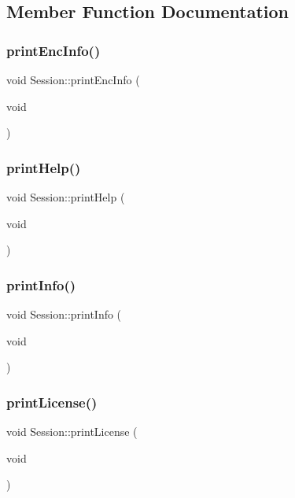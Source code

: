 \subsection{Member Function Documentation}
\mbox{\label{classSession_a3cf439480d64aaf8c65c32c8c402f277}} 
\subsubsection{print\+Enc\+Info()}
{\footnotesize\ttfamily void Session\+::print\+Enc\+Info (\begin{DoxyParamCaption}\item[{void}]{ }\end{DoxyParamCaption})\hspace{0.3cm}{\ttfamily [private]}}

\mbox{\label{classSession_a4f528c228412fae8608c02f121e2cb04}} 
\subsubsection{print\+Help()}
{\footnotesize\ttfamily void Session\+::print\+Help (\begin{DoxyParamCaption}\item[{void}]{ }\end{DoxyParamCaption})\hspace{0.3cm}{\ttfamily [private]}}

\mbox{\label{classSession_a78ac3a349227469585a5123c80d6c463}} 
\subsubsection{print\+Info()}
{\footnotesize\ttfamily void Session\+::print\+Info (\begin{DoxyParamCaption}\item[{void}]{ }\end{DoxyParamCaption})\hspace{0.3cm}{\ttfamily [private]}}

\mbox{\label{classSession_a15f0d2ecf0cbc76daa2e08e2632a735a}} 
\subsubsection{print\+License()}
{\footnotesize\ttfamily void Session\+::print\+License (\begin{DoxyParamCaption}\item[{void}]{ }\end{DoxyParamCaption})\hspace{0.3cm}{\ttfamily [private]}}

